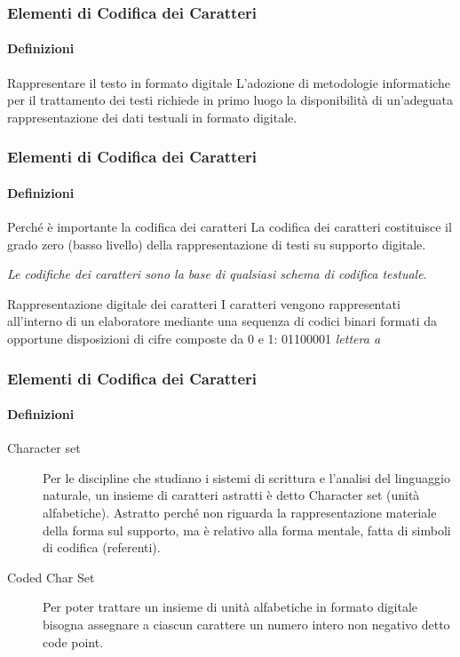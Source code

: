 
\begin{frame}
	\frametitle{Elementi di Codifica dei Caratteri}
	\framesubtitle{Definizioni}
	\addtocounter{nframe}{1}

	\begin{block}{Rappresentare il testo in formato digitale}
		L’adozione di metodologie informatiche per il trattamento dei testi richiede in primo luogo la disponibilità di un'adeguata rappresentazione dei dati testuali in formato digitale.
	\end{block}

\end{frame}

\begin{frame}
	\frametitle{Elementi di Codifica dei Caratteri}
	\framesubtitle{Definizioni}
	\addtocounter{nframe}{1}

	\begin{block}{Perché è importante la codifica dei caratteri}
		La codifica dei caratteri costituisce il grado zero (basso livello) della rappresentazione di testi su supporto digitale.
		\begin{center}
			\textit{Le codifiche dei caratteri sono la base di qualsiasi schema di codifica testuale}.
		\end{center}
	\end{block}



	\begin{block}{Rappresentazione digitale dei caratteri}
		I caratteri vengono rappresentati all’interno di un elaboratore mediante una sequenza di codici binari formati da opportune disposizioni di cifre composte da 0 e 1: 01100001 \textit{lettera a}
	\end{block}

\end{frame}

\begin{frame}
	\frametitle{Elementi di Codifica dei Caratteri}
	\framesubtitle{Definizioni}
	\addtocounter{nframe}{1}


	\begin{description}
		\item [Character set] Per le discipline che studiano i sistemi di scrittura e l'analisi del linguaggio naturale, un insieme di caratteri astratti è detto Character set (unità alfabetiche). Astratto perché non riguarda la rappresentazione materiale della forma sul supporto, ma è relativo alla forma mentale, fatta di simboli di codifica (referenti).
		\item [Coded Char Set] Per poter trattare un insieme di unità alfabetiche in formato digitale bisogna assegnare a ciascun carattere un numero intero non negativo detto code point.
		
	\end{description}

\end{frame}

